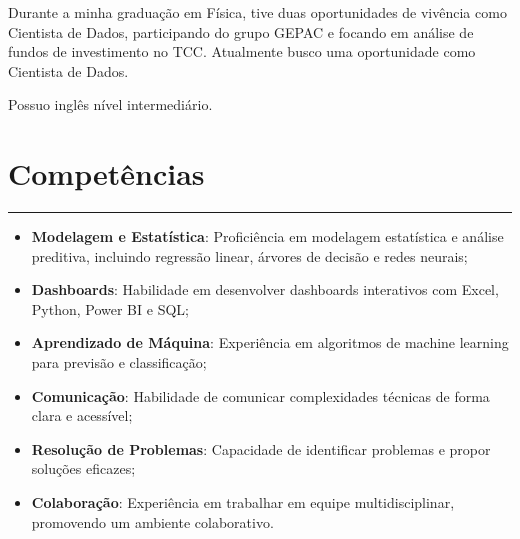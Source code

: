 \documentclass[10pt]{article}
\begin{document}
Durante a minha graduação em Física, tive duas oportunidades de vivência como Cientista de Dados, participando do grupo GEPAC e focando em análise de fundos de investimento no TCC. Atualmente busco uma oportunidade como Cientista de Dados.\\
\vspace{-5pt}

Possuo inglês nível intermediário.
\vspace{-5pt}

\section*{Competências}
\vspace{-15pt}
\rule{\linewidth}{1pt}

\begin{itemize} \itemsep -2pt
    \item \textbf{Modelagem e Estatística}: Proficiência em modelagem estatística e análise preditiva, incluindo regressão linear, árvores de decisão e redes neurais;

    \item \textbf{Dashboards}: Habilidade em desenvolver dashboards interativos com Excel, Python, Power BI e SQL;

    \item \textbf{Aprendizado de Máquina}: Experiência em algoritmos de machine learning para previsão e classificação;

    \item \textbf{Comunicação}: Habilidade de comunicar complexidades técnicas de forma clara e acessível;

    \item \textbf{Resolução de Problemas}: Capacidade de identificar problemas e propor soluções eficazes;

    \item \textbf{Colaboração}: Experiência em trabalhar em equipe multidisciplinar, promovendo um ambiente colaborativo.
\end{itemize}

\vspace{-11pt}
\end{document}
